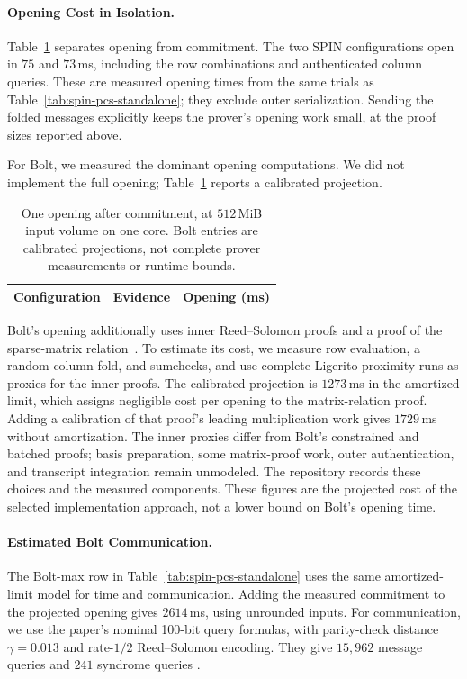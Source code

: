 \paragraph{Opening Cost in Isolation.}
Table~\ref{tab:pcs-opening} separates opening from commitment. The two
SPIN configurations open in $75$ and $73$\,ms, including the
row combinations and authenticated column queries. These are measured
opening times from the same trials as Table~\ref{tab:spin-pcs-standalone};
they exclude outer serialization. Sending the folded messages explicitly
keeps the prover's opening work small, at the proof sizes reported above.

For Bolt, we measured the dominant opening computations. We did not
implement the full opening; Table~\ref{tab:pcs-opening} reports a calibrated
projection.

\begin{table}[tb]
\centering
\caption{One opening after commitment, at $512$\,MiB input volume on one
core. Bolt entries are calibrated projections, not complete prover
measurements or runtime bounds.}
\label{tab:pcs-opening}
\small
\begin{tabular}{@{}llr@{}}
\toprule
Configuration & Evidence & Opening (ms) \\
\midrule

\end{tabular}
\end{table}

Bolt's opening additionally uses inner Reed--Solomon proofs and a proof
of the sparse-matrix relation~\cite{bolt26}. To estimate its cost, we
measure row evaluation, a random column fold, and sumchecks, and use
complete Ligerito proximity runs as proxies for the inner proofs. The
calibrated projection is $1273$\,ms in the amortized limit, which assigns
negligible cost per opening to the matrix-relation proof. Adding a
calibration of that proof's leading multiplication work gives $1729$\,ms
without amortization. The inner proxies differ from Bolt's constrained
and batched proofs; basis preparation, some matrix-proof work, outer
authentication, and transcript integration remain unmodeled. The
repository records these choices and the measured components\repositorycite.
These figures are the projected cost of the selected implementation
approach, not a lower bound on Bolt's opening time.

\paragraph{Estimated Bolt Communication.}
The Bolt-max row in Table~\ref{tab:spin-pcs-standalone} uses the same
amortized-limit model for time and communication. Adding the measured
commitment to the projected opening gives $2614$\,ms, using unrounded inputs.
For communication, we use the paper's nominal 100-bit query formulas,
with parity-check distance $\gamma=0.013$ and rate-$1/2$ Reed--Solomon
encoding. They give $15{,}962$ message queries and $241$ syndrome queries
\cite[Section 7.3]{bolt26}.

